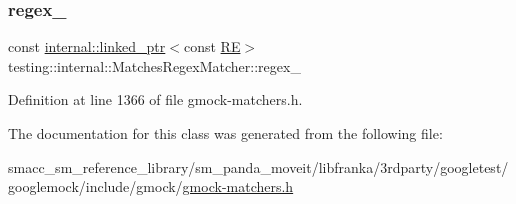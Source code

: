\subsubsection{\texorpdfstring{regex\+\_\+}{regex\_}}
{\footnotesize\ttfamily const \hyperlink{classtesting_1_1internal_1_1linked__ptr}{internal\+::linked\+\_\+ptr}$<$const \hyperlink{classtesting_1_1internal_1_1RE}{RE}$>$ testing\+::internal\+::\+Matches\+Regex\+Matcher\+::regex\+\_\+\hspace{0.3cm}{\ttfamily [private]}}



Definition at line 1366 of file gmock-\/matchers.\+h.



The documentation for this class was generated from the following file\+:\begin{DoxyCompactItemize}
\item 
smacc\+\_\+sm\+\_\+reference\+\_\+library/sm\+\_\+panda\+\_\+moveit/libfranka/3rdparty/googletest/googlemock/include/gmock/\hyperlink{gmock-matchers_8h}{gmock-\/matchers.\+h}\end{DoxyCompactItemize}
